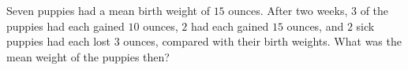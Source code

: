 Seven puppies had a mean birth weight of $15$ ounces. After two weeks, $3$ of the puppies had each gained $10$ ounces, $2$ had each gained $15$ ounces, and $2$ sick puppies had each lost $3$ ounces, compared with their birth weights. What was the mean weight of the puppies then?
